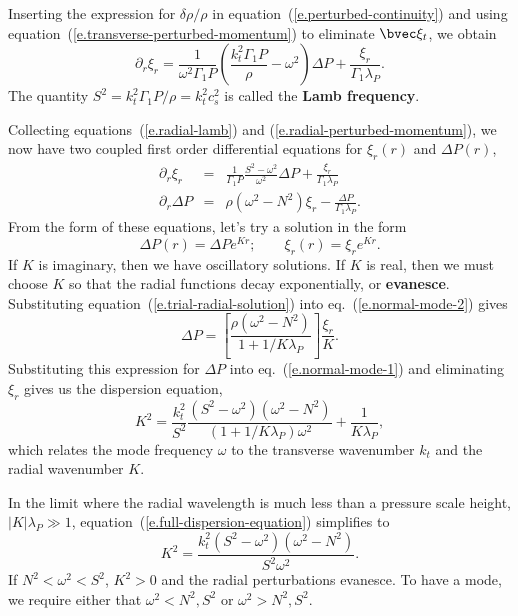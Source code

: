 Inserting the expression for $\delta\rho/\rho$ in equation~(\ref{e.perturbed-continuity}) and  using equation~(\ref{e.transverse-perturbed-momentum}) to eliminate $\vxi_{t}$, we obtain
\begin{equation}\label{e.radial-lamb}
\partial_{r} \xi_{r} = \frac{1}{\omega^{2}\Gamma_{1}P} \left(\frac{k_{t}^{2}\Gamma_{1}P}{\rho} - \omega^{2}\right)\Delta P + \frac{\xi_{r}}{\Gamma_{1}\lambda_{P}}.
\end{equation}
The quantity $S^{2} = k_{t}^{2} \Gamma_{1}P/\rho = k_{t}^{2}c_{s}^{2}$ is called the \textbf{Lamb frequency}.

Collecting equations~(\ref{e.radial-lamb}) and (\ref{e.radial-perturbed-momentum}), we now have two coupled first order differential equations for $\xi_{r}(r)$ and $\Delta P(r)$,
\begin{eqnarray}
\label{e.normal-mode-1}
\partial_{r}\xi_{r} &=& \frac{1}{\Gamma_{1}P} \frac{S^{2}-\omega^{2}}{\omega^{2}}\Delta P + \frac{\xi_{r}}{\Gamma_{1}\lambda_{P}}\\
\label{e.normal-mode-2}
\partial_{r}\Delta P &=& \rho(\omega^{2}-N^{2})\xi_{r} - \frac{\Delta P}{\Gamma_{1}\lambda_{P}}.
\end{eqnarray}
From the form of these equations, let's try a solution in the form
\begin{equation}\label{e.trial-radial-solution}
	\Delta P(r) = \Delta P e^{Kr}; \qquad \xi_{r}(r) = \xi_{r}e^{Kr}.
\end{equation}
If $K$ is imaginary, then we have oscillatory solutions.  If $K$ is real, then we must choose $K$ so that the radial functions decay exponentially, or \textbf{evanesce}.  Substituting equation~(\ref{e.trial-radial-solution}) into eq.~(\ref{e.normal-mode-2}) gives
\[
\Delta P = \left[\frac{\rho(\omega^{2}-N^{2})}{1 + 1/K\lambda_{P}}\right] \frac{\xi_{r}}{K}.
\]
Substituting this expression for $\Delta P$ into eq.~(\ref{e.normal-mode-1}) and eliminating $\xi_{r}$ gives us the dispersion equation,
\begin{equation}\label{e.full-dispersion-equation}
K^{2} = \frac{k_{t}^{2}}{S^{2}} \frac{(S^{2} - \omega^{2})(\omega^{2}-N^{2})}{(1 + 1/K\lambda_{P})\omega^{2}} + \frac{1}{K\lambda_{P}},
\end{equation}
which relates the mode frequency $\omega$ to the transverse wavenumber $k_{t}$ and the radial wavenumber $K$.

In the limit where the radial wavelength is much less than a pressure scale height, $|K|\lambda_{P}\gg 1$, equation~(\ref{e.full-dispersion-equation}) simplifies to
\begin{equation}\label{e.dispersion-equation}
K^{2} = \frac{k_{t}^{2}(S^{2} - \omega^{2})(\omega^{2}-N^{2})}{S^{2}\omega^{2}}.
\end{equation}
If $N^{2} < \omega^{2} < S^{2}$, $K^{2} > 0$ and the radial perturbations evanesce.  To have a mode, we require either that $\omega^{2} < N^{2}, S^{2}$ or $\omega^{2} > N^{2}, S^{2}$.  

